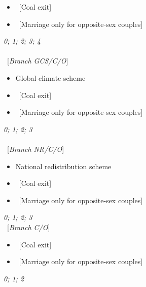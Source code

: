\begin{enumerate}[resume]
\begin{itemize}
    \item ~[Coal exit]  
    \item ~[Marriage only for opposite-sex couples]
\end{itemize}
\textit{0; 1; 2; 3; 4}\\
\\
~[\textit{Branch GCS/C/O}] \\
\begin{itemize}  \vspace{-1em}
    \item Global climate scheme 
    \item ~[Coal exit]  
    \item ~[Marriage only for opposite-sex couples]
\end{itemize}
\textit{0; 1; 2; 3}\\
\\
~[\textit{Branch NR/C/O}] \\
\begin{itemize}  \vspace{-1em}
    \item National redistribution scheme 
    \item ~[Coal exit]  
    \item ~[Marriage only for opposite-sex couples]
\end{itemize}
\textit{0; 1; 2; 3}
\\
~[\textit{Branch C/O}] \\
\begin{itemize}  \vspace{-1em}
    \item ~[Coal exit]  
    \item ~[Marriage only for opposite-sex couples]
\end{itemize}
\textit{0; 1; 2}\\
\end{enumerate}

